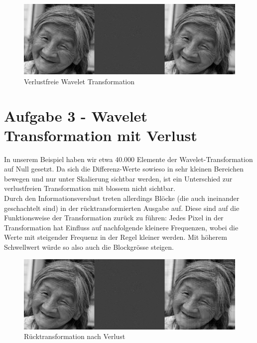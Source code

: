 \begin{figure}[H]
\begin{center}
\includegraphics[width=150mm]{u04/task2.eps}
\end{center}
\caption{Verlustfreie Wavelet Transformation}
\end{figure}


\section*{Aufgabe 3 - Wavelet Transformation mit Verlust}
In unserem Beispiel haben wir etwa 40.000 Elemente der Wavelet-Transformation auf Null gesetzt.
Da sich die Differenz-Werte sowieso in sehr kleinen Bereichen bewegen und nur unter Skalierung 
sichtbar werden, ist ein Unterschied zur verlustfreien Transformation mit blossem nicht sichtbar.
\\
Durch den Informationsverslust treten allerdings Bl\"ocke (die auch ineinander geschachtelt sind)
in der r\"ucktransformierten Ausgabe auf. Diese sind auf die Funktionsweise der Transformation
zur\"uck zu f\"uhren: Jedes Pixel in der Transformation hat Einfluss auf nachfolgende kleinere
Frequenzen, wobei die Werte mit steigender Frequenz in der Regel kleiner werden. Mit h\"oherem
Schwellwert w\"urde so also auch die Blockgr\"osse steigen. 

\begin{figure}[H]
\begin{center}
\includegraphics[width=150mm]{u04/task3.eps}
\end{center}
\caption{R\"ucktransformation nach Verlust}
\end{figure}


